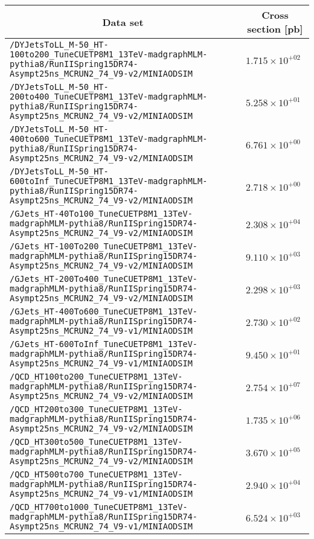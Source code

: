 \begin{center}
\begin{tabular}{ll}
\hline\hline
\multicolumn{1}{c}{Data set}&\multicolumn{1}{c}{Cross section [pb]}\tabularnewline
\hline
\verb!/DYJetsToLL_M-50_HT-100to200_TuneCUETP8M1_13TeV-madgraphMLM-pythia8/RunIISpring15DR74-Asympt25ns_MCRUN2_74_V9-v2/MINIAODSIM! &$1.715\times 10^{+02}$\tabularnewline
\verb!/DYJetsToLL_M-50_HT-200to400_TuneCUETP8M1_13TeV-madgraphMLM-pythia8/RunIISpring15DR74-Asympt25ns_MCRUN2_74_V9-v2/MINIAODSIM! &$5.258\times 10^{+01}$\tabularnewline
\verb!/DYJetsToLL_M-50_HT-400to600_TuneCUETP8M1_13TeV-madgraphMLM-pythia8/RunIISpring15DR74-Asympt25ns_MCRUN2_74_V9-v2/MINIAODSIM! &$6.761\times 10^{+00}$\tabularnewline
\verb!/DYJetsToLL_M-50_HT-600toInf_TuneCUETP8M1_13TeV-madgraphMLM-pythia8/RunIISpring15DR74-Asympt25ns_MCRUN2_74_V9-v2/MINIAODSIM! &$2.718\times 10^{+00}$\tabularnewline
\verb!/GJets_HT-40To100_TuneCUETP8M1_13TeV-madgraphMLM-pythia8/RunIISpring15DR74-Asympt25ns_MCRUN2_74_V9-v2/MINIAODSIM! &$2.308\times 10^{+04}$\tabularnewline
\verb!/GJets_HT-100To200_TuneCUETP8M1_13TeV-madgraphMLM-pythia8/RunIISpring15DR74-Asympt25ns_MCRUN2_74_V9-v2/MINIAODSIM! &$9.110\times 10^{+03}$\tabularnewline
\verb!/GJets_HT-200To400_TuneCUETP8M1_13TeV-madgraphMLM-pythia8/RunIISpring15DR74-Asympt25ns_MCRUN2_74_V9-v2/MINIAODSIM! &$2.298\times 10^{+03}$\tabularnewline
\verb!/GJets_HT-400To600_TuneCUETP8M1_13TeV-madgraphMLM-pythia8/RunIISpring15DR74-Asympt25ns_MCRUN2_74_V9-v1/MINIAODSIM! &$2.730\times 10^{+02}$\tabularnewline
\verb!/GJets_HT-600ToInf_TuneCUETP8M1_13TeV-madgraphMLM-pythia8/RunIISpring15DR74-Asympt25ns_MCRUN2_74_V9-v1/MINIAODSIM! &$9.450\times 10^{+01}$\tabularnewline
\verb!/QCD_HT100to200_TuneCUETP8M1_13TeV-madgraphMLM-pythia8/RunIISpring15DR74-Asympt25ns_MCRUN2_74_V9-v2/MINIAODSIM! &$2.754\times 10^{+07}$\tabularnewline
\verb!/QCD_HT200to300_TuneCUETP8M1_13TeV-madgraphMLM-pythia8/RunIISpring15DR74-Asympt25ns_MCRUN2_74_V9-v2/MINIAODSIM! &$1.735\times 10^{+06}$\tabularnewline
\verb!/QCD_HT300to500_TuneCUETP8M1_13TeV-madgraphMLM-pythia8/RunIISpring15DR74-Asympt25ns_MCRUN2_74_V9-v2/MINIAODSIM! &$3.670\times 10^{+05}$\tabularnewline
\verb!/QCD_HT500to700_TuneCUETP8M1_13TeV-madgraphMLM-pythia8/RunIISpring15DR74-Asympt25ns_MCRUN2_74_V9-v1/MINIAODSIM! &$2.940\times 10^{+04}$\tabularnewline
\verb!/QCD_HT700to1000_TuneCUETP8M1_13TeV-madgraphMLM-pythia8/RunIISpring15DR74-Asympt25ns_MCRUN2_74_V9-v1/MINIAODSIM! &$6.524\times 10^{+03}$\tabularnewline

\end{tabular}
\end{center}
